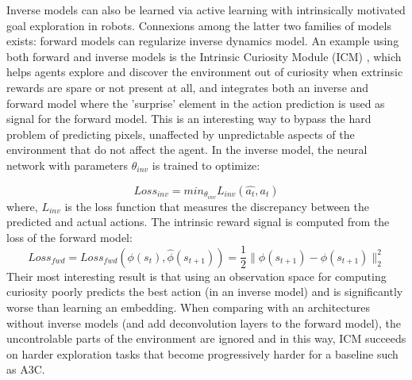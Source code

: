 \documentclass[a4paper]{article}
\begin{document}
Inverse models can also be learned via active learning \cite{Baranes13} with intrinsically motivated goal exploration in robots. Connexions among the latter two families of models exists: forward models can regularize inverse dynamics model. %
An example using both forward and inverse models is the Intrinsic Curiosity Module (ICM) \cite{Pathak17}, which helps agents explore and discover the environment out of curiosity when extrinsic rewards are spare or not present at all, and integrates both an inverse and forward model where the 'surprise' element in the action prediction is used as signal for the forward model. This is an interesting way to bypass the hard problem of predicting pixels, unaffected by unpredictable aspects of the environment that do not affect the agent. In the inverse model, the neural network with parameters  $\theta_{inv}$ is trained to optimize: 

\begin{equation}
Loss_{inv}=  min_{\theta_{inv}} L_{inv} (\hat{a_t}, a_t)  
\end{equation}
where, $L_{inv}$ is the loss function that measures the discrepancy between the predicted and actual actions. The intrinsic reward signal is computed from the loss of the forward model:
\begin{equation}
Loss_{fwd} = Loss_{fwd} (\phi(s_t), \hat{\phi}(s_{t+1})) = \frac{1}{2} \parallel \hat{\phi} (s_{t+1}) − \phi(s_{t+1}) \parallel_2 ^2
\end{equation} %
Their most interesting result is that using an observation space for computing curiosity poorly predicts the best action (in an inverse model) and is significantly worse than learning an embedding. When comparing with an architectures without inverse models (and add deconvolution layers to the forward model), the uncontrolable parts of the environment are ignored and in this way, ICM succeeds on harder exploration tasks that become progressively harder for a baseline such as A3C. %
\end{document}

